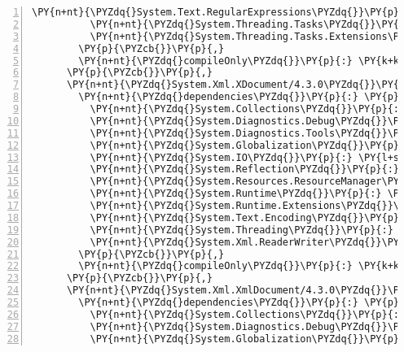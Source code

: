 \begin{Verbatim}[commandchars=\\\{\},numbers=left,firstnumber=1,stepnumber=1,numberblanklines=0]
          \PY{n+nt}{\PYZdq{}System.Text.RegularExpressions\PYZdq{}}\PY{p}{:} \PY{l+s+s2}{\PYZdq{}4.3.0\PYZdq{}}\PY{p}{,}
          \PY{n+nt}{\PYZdq{}System.Threading.Tasks\PYZdq{}}\PY{p}{:} \PY{l+s+s2}{\PYZdq{}4.3.0\PYZdq{}}\PY{p}{,}
          \PY{n+nt}{\PYZdq{}System.Threading.Tasks.Extensions\PYZdq{}}\PY{p}{:} \PY{l+s+s2}{\PYZdq{}4.5.0\PYZhy{}rc1\PYZdq{}}
        \PY{p}{\PYZcb{}}\PY{p}{,}
        \PY{n+nt}{\PYZdq{}compileOnly\PYZdq{}}\PY{p}{:} \PY{k+kc}{true}
      \PY{p}{\PYZcb{}}\PY{p}{,}
      \PY{n+nt}{\PYZdq{}System.Xml.XDocument/4.3.0\PYZdq{}}\PY{p}{:} \PY{p}{\PYZob{}}
        \PY{n+nt}{\PYZdq{}dependencies\PYZdq{}}\PY{p}{:} \PY{p}{\PYZob{}}
          \PY{n+nt}{\PYZdq{}System.Collections\PYZdq{}}\PY{p}{:} \PY{l+s+s2}{\PYZdq{}4.3.0\PYZdq{}}\PY{p}{,}
          \PY{n+nt}{\PYZdq{}System.Diagnostics.Debug\PYZdq{}}\PY{p}{:} \PY{l+s+s2}{\PYZdq{}4.3.0\PYZdq{}}\PY{p}{,}
          \PY{n+nt}{\PYZdq{}System.Diagnostics.Tools\PYZdq{}}\PY{p}{:} \PY{l+s+s2}{\PYZdq{}4.3.0\PYZdq{}}\PY{p}{,}
          \PY{n+nt}{\PYZdq{}System.Globalization\PYZdq{}}\PY{p}{:} \PY{l+s+s2}{\PYZdq{}4.3.0\PYZdq{}}\PY{p}{,}
          \PY{n+nt}{\PYZdq{}System.IO\PYZdq{}}\PY{p}{:} \PY{l+s+s2}{\PYZdq{}4.3.0\PYZdq{}}\PY{p}{,}
          \PY{n+nt}{\PYZdq{}System.Reflection\PYZdq{}}\PY{p}{:} \PY{l+s+s2}{\PYZdq{}4.3.0\PYZdq{}}\PY{p}{,}
          \PY{n+nt}{\PYZdq{}System.Resources.ResourceManager\PYZdq{}}\PY{p}{:} \PY{l+s+s2}{\PYZdq{}4.3.0\PYZdq{}}\PY{p}{,}
          \PY{n+nt}{\PYZdq{}System.Runtime\PYZdq{}}\PY{p}{:} \PY{l+s+s2}{\PYZdq{}4.3.0\PYZdq{}}\PY{p}{,}
          \PY{n+nt}{\PYZdq{}System.Runtime.Extensions\PYZdq{}}\PY{p}{:} \PY{l+s+s2}{\PYZdq{}4.3.0\PYZdq{}}\PY{p}{,}
          \PY{n+nt}{\PYZdq{}System.Text.Encoding\PYZdq{}}\PY{p}{:} \PY{l+s+s2}{\PYZdq{}4.3.0\PYZdq{}}\PY{p}{,}
          \PY{n+nt}{\PYZdq{}System.Threading\PYZdq{}}\PY{p}{:} \PY{l+s+s2}{\PYZdq{}4.3.0\PYZdq{}}\PY{p}{,}
          \PY{n+nt}{\PYZdq{}System.Xml.ReaderWriter\PYZdq{}}\PY{p}{:} \PY{l+s+s2}{\PYZdq{}4.3.0\PYZdq{}}
        \PY{p}{\PYZcb{}}\PY{p}{,}
        \PY{n+nt}{\PYZdq{}compileOnly\PYZdq{}}\PY{p}{:} \PY{k+kc}{true}
      \PY{p}{\PYZcb{}}\PY{p}{,}
      \PY{n+nt}{\PYZdq{}System.Xml.XmlDocument/4.3.0\PYZdq{}}\PY{p}{:} \PY{p}{\PYZob{}}
        \PY{n+nt}{\PYZdq{}dependencies\PYZdq{}}\PY{p}{:} \PY{p}{\PYZob{}}
          \PY{n+nt}{\PYZdq{}System.Collections\PYZdq{}}\PY{p}{:} \PY{l+s+s2}{\PYZdq{}4.3.0\PYZdq{}}\PY{p}{,}
          \PY{n+nt}{\PYZdq{}System.Diagnostics.Debug\PYZdq{}}\PY{p}{:} \PY{l+s+s2}{\PYZdq{}4.3.0\PYZdq{}}\PY{p}{,}
          \PY{n+nt}{\PYZdq{}System.Globalization\PYZdq{}}\PY{p}{:} \PY{l+s+s2}{\PYZdq{}4.3.0\PYZdq{}}\PY{p}{,}

\end{Verbatim}
